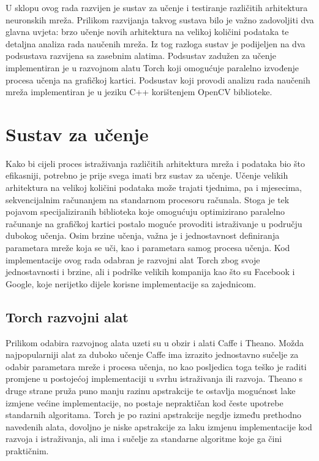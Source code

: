 \documentclass[lmodern, utf8, diplomski, numeric]{fer}
\begin{document}
U sklopu ovog rada razvijen je sustav za učenje i testiranje različitih arhitektura neuronskih mreža. Prilikom razvijanja takvog sustava bilo je važno zadovoljiti dva glavna uvjeta: brzo učenje novih arhitektura na velikoj količini podataka te detaljna analiza rada naučenih mreža. Iz tog razloga sustav je podijeljen na dva podsustava razvijena sa zasebnim alatima. Podsustav zadužen za učenje implementiran je u razvojnom alatu Torch koji omogućuje paralelno izvođenje procesa učenja na grafičkoj kartici. Podsustav koji provodi analizu rada naučenih mreža implementiran je u jeziku C++ korištenjem OpenCV biblioteke.

\section{Sustav za učenje}

Kako bi cijeli proces istraživanja različitih arhitektura mreža i podataka bio što efikasniji, potrebno je prije svega imati brz sustav za učenje. Učenje velikih arhitektura na velikoj količini podataka može trajati tjednima, pa i mjesecima, sekvencijalnim računanjem na standarnom procesoru računala. Stoga je tek pojavom specijaliziranih biblioteka koje omogućuju optimizirano paralelno računanje na grafičkoj kartici postalo moguće provoditi istraživanje u području dubokog učenja. 
Osim brzine učenja, važna je i jednostavnost definiranja parametara mreže koja se uči, kao i parametara samog procesa učenja. Kod implementacije ovog rada odabran je razvojni alat Torch zbog svoje jednostavnosti i brzine, ali i podrške velikih kompanija kao što su Facebook i Google, koje nerijetko dijele korisne implementacije sa zajednicom. 

\subsection{Torch razvojni alat}

Prilikom odabira razvojnog alata uzeti su u obzir i alati Caffe i Theano. Možda najpopularniji alat za duboko učenje Caffe ima izrazito jednostavno sučelje za odabir parametara mreže i procesa učenja, no kao posljedica toga teško je raditi promjene u postojećoj implementaciji u svrhu istraživanja ili razvoja. Theano s druge strane pruža puno manju razinu apstrakcije te ostavlja mogućnost lake izmjene većine implementacije, no postaje nepraktičan kod česte upotrebe standarnih algoritama.
Torch je po razini apstrakcije negdje između prethodno navedenih alata, dovoljno je niske apstrakcije za laku izmjenu implementacije kod razvoja i istraživanja, ali ima i sučelje za standarne algoritme koje ga čini praktičnim. 
\end{document}
